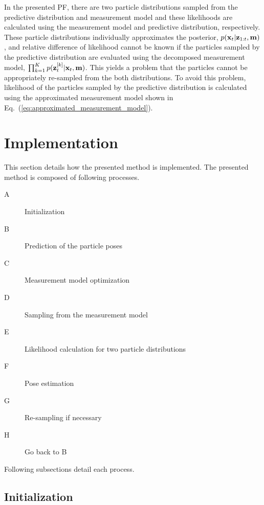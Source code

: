 \documentclass[letterpaper, 10 pt, conference]{ieeeconf}  %
\begin{document}
In the presented PF, there are two particle distributions sampled from the predictive distribution and measurement model and these likelihoods are calculated using the measurement model and predictive distribution, respectively.
These particle distributions individually approximates the posterior, $p({\bf x}_{t} | {\bf z}_{1:t}, {\bf m})$, and relative difference of likelihood cannot be known if the particles sampled by the predictive distribution are evaluated using the decomposed measurement model, $\prod_{k=1}^{K} p({\bf z}_{t}^{[k]} | {\bf x}_{t}, {\bf m})$.
This yields a problem that the particles cannot be appropriately re-sampled from the both distributions.
To avoid this problem, likelihood of the particles sampled by the predictive distribution is calculated using the approximated measurement model shown in Eq.~(\ref{eq:approximated_measurement_model}).


















\section{Implementation}
\label{sec:implementation}

This section details how the presented method is implemented.
The presented method is composed of following processes.
%
\begin{description}
    \item[A] Initialization
    \item[B] Prediction of the particle poses
    \item[C] Measurement model optimization
    \item[D] Sampling from the measurement model
    \item[E] Likelihood calculation for two particle distributions
    \item[F] Pose estimation
    \item[G] Re-sampling if necessary
    \item[H] Go back to B
\end{description}
%
Following subsections detail each process.



\subsection{Initialization}
\end{document}
